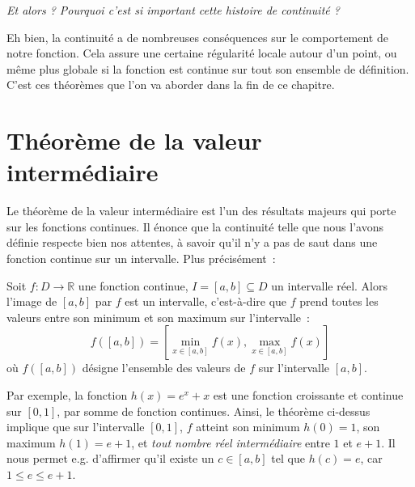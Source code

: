 \begin{greybox}
\textit{Et alors ? Pourquoi c'est si important cette histoire de continuité ?}
\end{greybox}

Eh bien, la continuité a de nombreuses conséquences sur le comportement de notre fonction. Cela assure une certaine régularité locale autour d'un point, ou même plus globale si la fonction est continue sur tout son ensemble de définition. C'est ces théorèmes que l'on va aborder dans la fin de ce chapitre.

\section{Théorème de la valeur intermédiaire}
Le théorème de la valeur intermédiaire est l'un des résultats majeurs qui porte sur les fonctions continues. Il énonce que la continuité telle que nous l'avons définie respecte bien nos attentes, à savoir qu'il n'y a pas de saut dans une fonction continue sur un intervalle. Plus précisément~:
\begin{boxthm}
Soit $f : D \to \mathbb{R}$ une fonction continue, $I = [a, b] \subseteq D$ un intervalle réel. Alors l'image de $[a, b]$ par $f$ est un intervalle, c'est-à-dire que $f$ prend toutes les valeurs entre son minimum et son maximum sur l'intervalle~:
\begin{equation}
f([a, b]) = \left[\min_{x \in [a, b]} f(x), \max_{x \in [a, b]} f(x)\right]
\end{equation}
où $f([a, b])$ désigne l'ensemble des valeurs de $f$ sur l'intervalle $[a, b]$.
\end{boxthm}
Par exemple, la fonction $h(x) = e^x + x$ est une fonction croissante et continue sur $[0, 1]$, par somme de fonction continues. Ainsi, le théorème ci-dessus implique que sur l'intervalle $[0, 1]$, $f$ atteint son minimum $h(0) = 1$, son maximum $h(1) = e + 1$, et \emph{tout nombre réel intermédiaire} entre $1$ et $e + 1$. Il nous permet e.g. d'affirmer qu'il existe un $c \in [a, b]$ tel que $h(c) = e$, car $1 \leq e \leq e + 1$.

